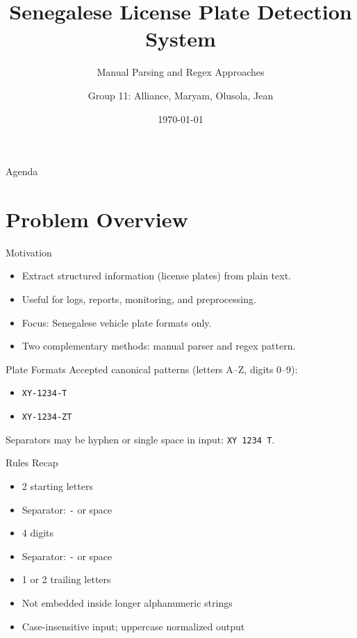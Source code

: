\documentclass[aspectratio=169]{beamer}
\title[Plate Detection]{Senegalese License Plate Detection System}
\subtitle{Manual Parsing and Regex Approaches}
\author{Group 11: Alliance, Maryam, Olusola, Jean}
\institute{AIMS Rwanda}
\date{\today}
\newcommand{\code}[1]{\texttt{#1}}
\begin{document}
\begin{frame}
  \titlepage
\end{frame}

\begin{frame}{Agenda}
  \tableofcontents[hidesubsections]
\end{frame}

\section{Problem Overview}

\begin{frame}{Motivation}
  \begin{itemize}
    \item Extract structured information (license plates) from plain text.
    \item Useful for logs, reports, monitoring, and preprocessing.
    \item Focus: Senegalese vehicle plate formats only.
    \item Two complementary methods: manual parser and regex pattern.
  \end{itemize}
\end{frame}

\begin{frame}{Plate Formats}
  Accepted canonical patterns (letters A--Z, digits 0--9):
  \begin{itemize}
    \item \code{XY-1234-T}
    \item \code{XY-1234-ZT}
  \end{itemize}
  Separators may be hyphen or single space in input: \code{XY 1234 T}.
\end{frame}

\begin{frame}{Rules Recap}
  \begin{itemize}
    \item 2 starting letters
    \item Separator: \code{-} or space
    \item 4 digits
    \item Separator: \code{-} or space
    \item 1 or 2 trailing letters
    \item Not embedded inside longer alphanumeric strings
    \item Case-insensitive input; uppercase normalized output
  \end{itemize}
\end{frame}
\end{document}
